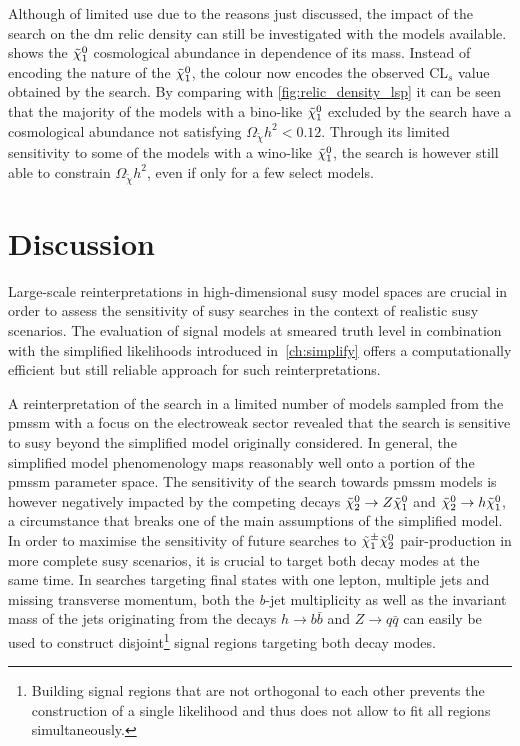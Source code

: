 Although of limited use due to the reasons just discussed, the impact of the \onelepton search on the \gls{dm} relic density can still be investigated with the models available.  shows the $\tilde{\chi}_1^0$ cosmological abundance in dependence of its mass. Instead of encoding the nature of the $\tilde{\chi}_1^0$, the colour now encodes the observed CL$_s$ value obtained by the \onelepton search. By comparing with \cref{fig:relic_density_lsp} it can be seen that the majority of the models with a bino-like $\tilde{\chi}_1^0$ excluded by the \onelepton search have a cosmological abundance not satisfying $\Omega_{\tilde{\chi}} h^2 < 0.12$. Through its limited sensitivity to some of the models with a wino-like $\tilde{\chi}_1^0$, the \onelepton search is however still able to constrain $\Omega_{\tilde{\chi}} h^2$, even if only for a few select models. 



\section{Discussion}

Large-scale reinterpretations in high-dimensional \gls{susy} model spaces are crucial in order to assess the sensitivity of \gls{susy} searches in the context of realistic \gls{susy} scenarios. The evaluation of signal models at smeared truth level in combination with the simplified likelihoods introduced in~\cref{ch:simplify} offers a computationally efficient but still reliable approach for such reinterpretations.

A reinterpretation of the \onelepton search in a limited number of models sampled from the \gls{pmssm} with a focus on the electroweak sector revealed that the search is sensitive to \gls{susy} beyond the simplified model originally considered. In general, the simplified model phenomenology maps reasonably well onto a portion of the \gls{pmssm} parameter space. The sensitivity of the \onelepton search towards \gls{pmssm} models is however negatively impacted by the competing decays $\tilde{\chi}_2^0 \rightarrow Z \tilde{\chi}_1^0$ and $\tilde{\chi}_2^0 \rightarrow h \tilde{\chi}_1^0$, a circumstance that breaks one of the main assumptions of the simplified model. In order to maximise the sensitivity of future searches to $\tilde{\chi}_1^\pm\tilde{\chi}_2^0$ pair-production in more complete \gls{susy} scenarios, it is crucial to target both decay modes at the same time. In searches targeting final states with one lepton, multiple jets and missing transverse momentum, both the \textit{b}-jet multiplicity as well as the invariant mass of the jets originating from the decays $h\rightarrow b\bar{b}$ and $Z\rightarrow q\bar{q}$ can easily be used to construct disjoint\footnote{Building signal regions that are not orthogonal to each other prevents the construction of a single likelihood and thus does not allow to fit all regions simultaneously.} signal regions targeting both decay modes.

